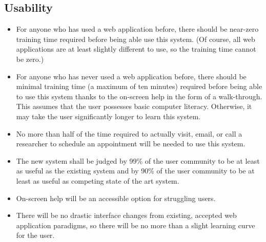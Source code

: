 \subsection{Usability}
\begin{itemize}
\item For anyone who has used a web application before, there should be near-zero training time required before being able use this system. (Of course, all web applications are at least slightly different to use, so the training time cannot be zero.)
\item For anyone who has never used a web application before, there should be minimal training time (a maximum of ten minutes) required before being able to use this system thanks to the on-screen help in the form of a walk-through. This assumes that the user possesses basic computer literacy. Otherwise, it may take the user significantly longer to learn this system.
\item No more than half of the time required to actually visit, email, or call a researcher to schedule an appointment will be needed to use this system.
\item The new system shall be judged by 99\% of the user community to be at least as useful as the existing system and by 90\% of the user community to be at least as useful as competing state of the art system.
\item On-screen help will be an accessible option for struggling users.
\item There will be no drastic interface changes from existing, accepted web application paradigms, so there will be no more than a slight learning curve for the user.
\end{itemize}
